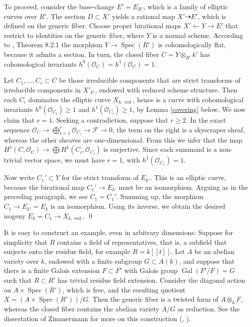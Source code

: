 \documentclass[oneside, 12pt]{amsart}
\theoremstyle{definition}
\theoremstyle{remark}
\newcommand{\shF}{\mathscr{F}}
\newcommand{\Gal}{\operatorname{Gal}}
\renewcommand{\O}{\mathscr{O}}
\newcommand{\ra}{\rightarrow}
\newcommand{\red}{{\operatorname{red}}}
\newcommand{\Spec}{\operatorname{Spec}}
\begin{document}
To proceed, consider the base-change $E'=E_{R'}$, which is a family of elliptic curves over $R'$.
The section $D\subset X'$ yields a  rational map $X'\dashrightarrow E'$, which is 
defined on the generic fiber. Choose  proper birational  maps $X'\leftarrow Y\ra E'$
that restrict to identities on the generic fiber,  where $Y$ is a normal scheme.
According to \cite{Raynaud 1970}, Theorem 8.2.1 the morphism $Y\ra\Spec(R')$ is cohomologically flat,
because it admits a section. In turn, the closed fiber $C=Y\otimes_{R'}k'$ has cohomological invariants
$h^0(\O_C)=h^1(\O_{C})=1$.

Let $C_1,\ldots,C_r\subset C$ be those irreducible components
that are strict transforms of irreducible components in $X'_{k'}$, endowed with reduced scheme structure.
Then each $C_i$ dominates the elliptic curve $X_{k,\red}$,
hence is a curve with cohomological invariants $h^0(\O_{C_i})\geq 1$ and  $h^1(\O_{C_i})\geq 1$,
by Lemma \ref{covering} below. We now claim that  $r=1$.
Seeking a contradiction,   suppose that $r\geq 2$. In the   exact sequence
$\O_C\ra \bigoplus_{i=1}^r \O_{C_i}\ra \shF\ra 0$,
the term on the right is a skyscraper sheaf, whereas the other sheaves are one-dimensional.
From this we infer that the map  $H^1(C,\O_C)\ra \bigoplus H^1(C_i,\O_{C_i})$
is surjective. Since each summand is a non-trivial vector space, we must have $r=1$, with $h^1(\O_{C_1})=1$.

Now write $C_1'\subset Y$ for the strict transform of  $E_{k'}$. This is an elliptic curve, because the birational map $C_1'\ra E_{k'}$ 
must be an  isomorphism.
Arguing as in the preceding paragraph, we see $C_1= C_1'$.
Summing up, the morphism $C_1\ra E_{k'}=E_k$ is an isomorphism. Using its inverse, we obtain
the desired isogeny   $E_k=C_1\ra   X_{k,\red} $.
\qed

\medskip 
It is easy to construct an example, even in arbitrary dimensions: Suppose for simplicity that $R$ contains a field of representatives,
that is, a subfield that surjects onto the residue field, for example $R=k[[t]]$.
Let $A$ be an abelian variety over $k$, endowed with a finite subgroup $G\subset A(k)$, 
and suppose that there is a finite Galois extension $F\subset F'$ with
Galois group $\Gal(F'/F)=G$ such that $R\subset R'$ has trivial residue field extension. 
Consider the diagonal action on $A\times\Spec(R')$, which is free,
and the resulting quotient $X=(A\times\Spec(R'))/G$. Then the generic fiber is a twisted form
of $A\otimes_k F$, whereas the closed fiber contains the abelian variety $A/G$ as reduction.
See the dissertation of Zimmermann  for more on this construction (\cite{Zimmermann 2019a}, \cite{Zimmermann 2021}).
\end{document}
